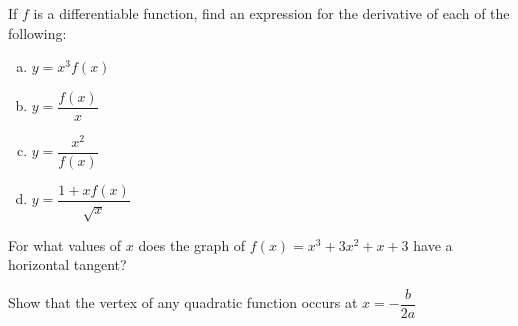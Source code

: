 \documentclass[notes]{subfiles}
\begin{document}
		\begin{ex}
			If $f$ is a differentiable function, find an expression for the derivative of each of the following:
			\begin{enumerate}[(a)]
				\item $y = x^3f(x)$
					
				\item $y = \dfrac{f(x)}{x}$
					\newpage
					
				\item $y = \dfrac{x^2}{f(x)}$
					
				\item $y = \dfrac{1 + xf(x)}{\sqrt{x}}$
			\end{enumerate}
		\end{ex}
		
		\begin{ex}
			For what values of $x$ does the graph of $f(x) = x^3 + 3x^2 + x + 3$ have a horizontal tangent?
		\end{ex}
			\vs{1}
			
		\begin{ex}
			Show that the vertex of any quadratic function occurs at $x=-\dfrac{b}{2a}$
		\end{ex}
	\clearpage
\end{document}
